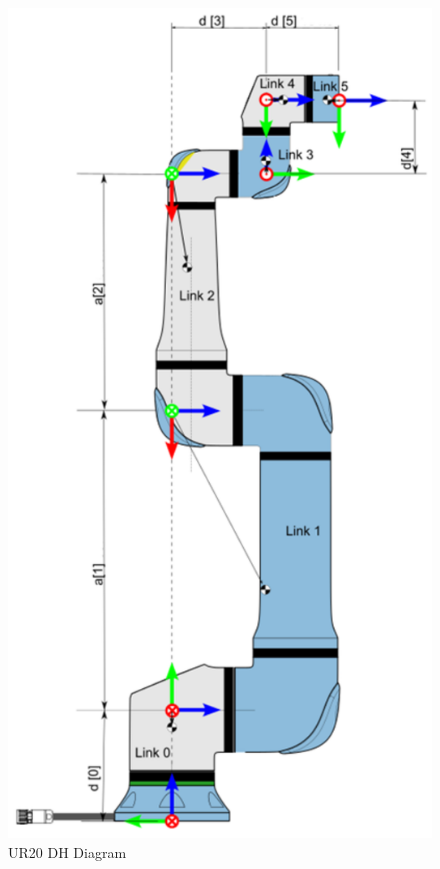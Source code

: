 \documentclass[journal]{new-aiaa}
\begin{document}
\begin{figure}[H]
    \centering
    \begin{minipage}{0.45\textwidth}
        \centering
        \includegraphics[width=\textwidth]{UR_Diagram.PNG}
        \caption{UR20 DH Diagram \cite{UR20DH}}
        \label{fig:UR DH Diagram}

\end{minipage}
\end{figure}
\end{document}
